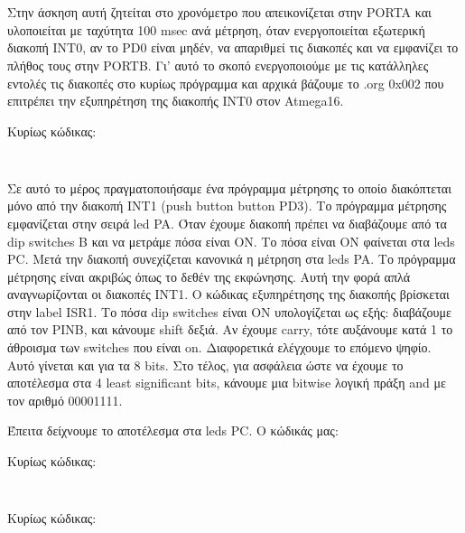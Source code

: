 \documentclass[a4paper,10pt]{article} \usepackage{anysize}
\begin{document}
\def\thesubsection {Άσκηση (\roman{subsection})}



\section*{} 
\subsection{}

Στην άσκηση αυτή ζητείται στο χρονόμετρο που απεικονίζεται στην PORTA και
υλοποιείται με ταχύτητα 100 msec ανά μέτρηση, όταν ενεργοποιείται εξωτερική
διακοπή INT0, αν το PD0 είναι μηδέν, να απαριθμεί τις διακοπές και να
εμφανίζει το πλήθος τους στην PORTB. Γι' αυτό το σκοπό ενεργοποιούμε με τις
κατάλληλες εντολές τις διακοπές στο κυρίως πρόγραμμα και αρχικά βάζουμε το
.org 0x002 που επιτρέπει την εξυπηρέτηση της διακοπής INT0 στον Atmega16.

\noindent Κυρίως κώδικας:
\inputminted[linenos,obeytabs,fontsize=\footnotesize]{nasm}{files/part1.S}

\subsection{}
Σε αυτό το μέρος πραγματοποιήσαμε ένα πρόγραμμα μέτρησης το οποίο διακόπτεται
μόνο από την διακοπή INT1 (push button button PD3).  Το πρόγραμμα μέτρησης
εμφανίζεται στην σειρά led PA. Όταν έχουμε διακοπή πρέπει να διαβάζουμε από τα
dip switches B και να μετράμε πόσα είναι ON.  Το πόσα είναι ON φαίνεται στα
leds PC. Μετά την διακοπή συνεχίζεται κανονικά η μέτρηση στα leds PA.  Το
πρόγραμμα μέτρησης είναι ακριβώς όπως το δεθέν της εκφώνησης. Αυτή την φορά
απλά αναγνωρίζονται οι διακοπές INT1. Ο κώδικας εξυπηρέτησης της διακοπής
βρίσκεται στην label ISR1. Το πόσα dip switches είναι ON υπολογίζεται ως εξής:
διαβάζουμε από τον PINB, και κάνουμε shift δεξιά. Αν έχουμε carry, τότε
αυξάνουμε κατά 1 το άθροισμα των switches που είναι on. Διαφορετικά ελέγχουμε
το επόμενο ψηφίο. Αυτό γίνεται και για τα 8 bits.  Στο τέλος, για ασφάλεια
ώστε να έχουμε το αποτέλεσμα στα 4 least significant bits, κάνουμε μια bitwise
λογική πράξη and με τον αριθμό 00001111.

Έπειτα δείχνουμε το αποτέλεσμα στα leds PC. Ο κώδικάς μας: 

\noindent Κυρίως κώδικας:
\inputminted[linenos,obeytabs,fontsize=\footnotesize]{nasm}{files/part2.S}

\subsection{}

\noindent Κυρίως κώδικας:
\inputminted[linenos,obeytabs,fontsize=\footnotesize]{nasm}{files/part3.S}
\end{document}
